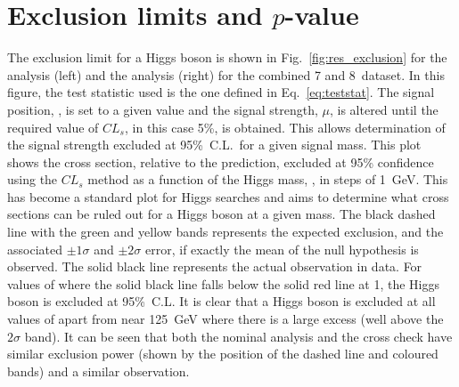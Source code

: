 \section{Exclusion limits and $p$-value}

The exclusion limit for a \SM Higgs boson is shown in Fig.~\ref{fig:res_exclusion} for the \MFM analysis (left) and the \SMVA analysis (right) for the combined 7 and 8~\TeV dataset. In this figure, the test statistic used is the one defined in Eq.~\ref{eq:teststat}. The signal position, \mH, is set to a given value and the signal strength, $\mu$, is altered until the required value of $CL_{s}$, in this case 5\%, is obtained. This allows determination of the signal strength excluded at 95\%~C.L.~for a given signal mass. This plot shows the cross section, relative to the \SM prediction, excluded at 95\% confidence using the $CL_{s}$ method as a function of the Higgs mass, \mH, in steps of 1~GeV. This has become a standard plot for Higgs searches and aims to determine what cross sections can be ruled out for a Higgs boson at a given mass. The black dashed line with the green and yellow bands represents the expected exclusion, and the associated $\pm1\sigma$ and $\pm2\sigma$ error, if exactly the mean of the null hypothesis is observed. The solid black line represents the actual observation in data. For values of \mH where the solid black line falls below the solid red line at 1, the \SM Higgs boson is excluded at 95\%~C.L. It is clear that a \SM Higgs boson is excluded at all values of \mH apart from near 125~GeV where there is a large excess (well above the $2\sigma$ band).
It can be seen that both the nominal \MFM analysis and the cross check \SMVA have similar exclusion power (shown by the position of the dashed line and coloured bands) and a similar observation.

